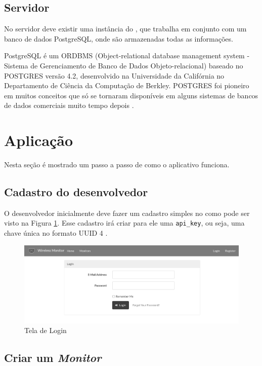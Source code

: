 \subsection{Servidor}\label{servidor}

No servidor deve existir uma instância do \wm, que trabalha em conjunto
com um banco de dados PostgreSQL, onde são armazenadas todas as
informações.

PostgreSQL é um ORDBMS (Object-relational database management system -
Sistema de Gerenciamento de Banco de Dados Objeto-relacional) baseado no
POSTGRES versão 4.2, desenvolvido na Universidade da Califórnia no
Departamento de Ciência da Computação de Berkley. POSTGRES foi pioneiro
em muitos conceitos que só se tornaram disponíveis em alguns sistemas de
bancos de dados comerciais muito tempo depois \cite{postgresql:2016}.

\section{Aplicação}\label{aplicauxe7uxe3o}

Nesta seção é mostrado um passo a passo de como o aplicativo funciona.

\subsection{Cadastro do desenvolvedor}\label{cadastro-do-desenvolvedor}

O desenvolvedor inicialmente deve fazer um cadastro simples no \wm
como pode ser visto na Figura \ref{fig:login-screen}. Esse cadastro irá
criar para ele uma \texttt{api\_key}, ou seja, uma chave única no
formato UUID 4 \cite{rfc4122:2005}.

\begin{figure}[h]
    \centering
    \includegraphics[scale=0.4]{img/login-screen-grey.png}
    \caption{Tela de Login} \label{fig:login-screen}
\end{figure}

\subsection{Criar um \emph{Monitor}}\label{criar-um-monitor}

